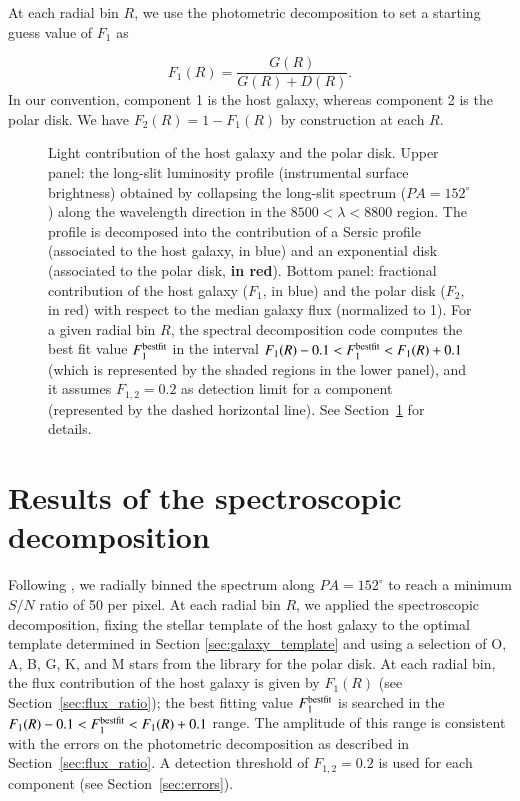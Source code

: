 \documentclass{aa}
\begin{document}
At each radial bin $R$, we use the photometric decomposition to set a
starting guess value of $F_1$ as

\[
F_1(R) = \frac{G(R)}{G(R) + D(R)}.
\]
In our convention, component 1 is the host galaxy, whereas component 2
is the polar disk.  We have $F_2(R) = 1-F_1(R)$ by construction at
each $R$.



\begin{figure}
  \caption{Light contribution of the host galaxy and the polar
    disk. Upper panel: the long-slit luminosity profile (instrumental
    surface brightness) obtained by collapsing the long-slit spectrum
    ($PA=152^{\circ}$) along the wavelength direction in the $8500<
    \lambda< 8800$ region. The profile is decomposed into the
    contribution of a Sersic profile (associated to the host galaxy,
    in blue) and an exponential disk (associated to the polar disk, {\bf in
    red}). Bottom panel: fractional contribution of the host galaxy
    ($F_1$, in blue) and the polar disk ($F_2$, in red) with respect
    to the median galaxy flux (normalized to 1). For a given radial
    bin $R$, the spectral decomposition code computes the best fit
    value $F_1^{\rm bestfit}$ in the interval $F_1(R)-0.1 < F_1^{\rm
      best fit} < F_1(R)+0.1$ (which is represented by the shaded
      regions in the lower panel), and it assumes $F_{1,2}=0.2$ as
    detection limit for a component (represented by the dashed
    horizontal line). See Section~\ref{sec:spec_dec_results} for
    details.}
\label{fig:flux_ratio}
\end{figure}


\section{Results of the spectroscopic decomposition}
\label{sec:spec_dec_results}

Following \citet{Iodice+06}, we radially binned the spectrum along
$PA=152^{\circ}$ to reach a minimum $S/N$ ratio of 50 per pixel. At
each radial bin $R$, we applied the spectroscopic decomposition, fixing
the stellar template of the host galaxy to the optimal template
determined in Section \ref{sec:galaxy_template} and using a selection
of O, A, B, G, K, and M stars from the \citet{Cenarro+01} library for
the polar disk. At each radial bin, the flux contribution of the host
galaxy is given by $F_1(R)$ (see Section~\ref{sec:flux_ratio}); the
best fitting value $F_1^{\rm best fit}$ is searched in the $F_1(R)-0.1
< F_1^{\rm best fit} < F_1(R)+0.1$ range. The amplitude of this range
is consistent with the errors on the photometric decomposition as
described in Section~\ref{sec:flux_ratio}. A detection threshold of
$F_{1,2}=0.2$ is used for each component (see
Section~\ref{sec:errors}).
\end{document}
